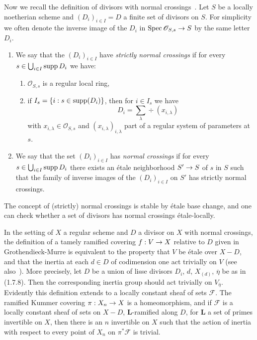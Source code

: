 \documentclass[deligne.tex]{subfiles}
\begin{document}
Now we recall the definition of divisors with normal
crossings~\cite[1.8]{GM}.
Let $S$ be a locally noetherian scheme and $(D_i)_{i\in I}=D$ a finite set
of divisors on $S$. For simplicity we often denote the inverse image of the
$D_i$ in $\operatorname{Spec} \mathscr O_{S,s}\rightarrow S$ by the same letter $D_i$.
\begin{definition*}
	\begin{enumerate}[label=\alph*)]
		\item We say that the $(D_i)_{i\in I}$ have
		\emph{strictly normal crossings} if for every
		$s\in\bigcup_{i\in I}\operatorname{supp} D_i$ we have:
		\begin{enumerate}[label=\roman*)]
			\item $\mathscr O_{S,s}$ is a regular local ring,
			\item if $I_s=\{i:s\in\operatorname{supp}(D_i)\}$, then for $i\in I_s$ we have
			\begin{equation*}
				\qquad D_i=\sum_\lambda\div(x_{i,\lambda})
			\end{equation*}
			with $x_{i,\lambda}\in\mathscr O_{S,s}$ and
			$(x_{i,\lambda})_{i,\lambda}$ part of a regular system of
			parameters at $s$.
		\end{enumerate}
		\item We say that the set $(D_i)_{i\in I}$ has \emph{normal crossings}
		if for every $s\in\bigcup_{i\in I}\operatorname{supp} D_i$ there exists an étale
		neighborhood $S'\rightarrow S$ of $s$ in $S$ such that the family of inverse
		images of the $(D_i)_{i\in I}$ on $S'$ has strictly normal crossings.
	\end{enumerate}
\end{definition*}
\begin{remark}
	The concept of (strictly) normal crossings is stable by étale base 
	change, and one can check whether a set of divisors has normal crossings
	étale-locally.
\end{remark}
In the setting of $X$ a regular scheme and $D$ a divisor on $X$ with normal
crossings, the definition of a tamely ramified covering $f:V\rightarrow X$ relative
to $D$ given in Grothendieck-Murre is equivalent to the property that $V$ be
étale over $X-D$, and that the inertia at each $d\in D$ of codimension one
act trivially on $V$ (see also~\cite[Exp. XIII, 2.1]{SGA1}).
More precisely, let $D$ be a union of lisse divisors 
$D_i$, $d$, $X_{(d)}$, $\overline\eta$ be as in (1.7.8). Then the corresponding inertia group should act trivially on
$V_{\overline\eta}$. Evidently this definition extends to a locally constant
sheaf of sets $\mathscr F$. The ramified Kummer covering $\pi:X_n\rightarrow X$ is
a homeomorphism, and if $\mathscr F$ is a locally constant sheaf of sets on
$X-D$, $\mathbf L$-ramified along $D$, for $\mathbf L$ a set of primes
invertible on $X$, then there is an $n$ invertible on $X$ such that the
action of inertia with respect to every point of $X_n$ on
$\pi^\ast\mathscr F$ is trivial.
\end{document}
